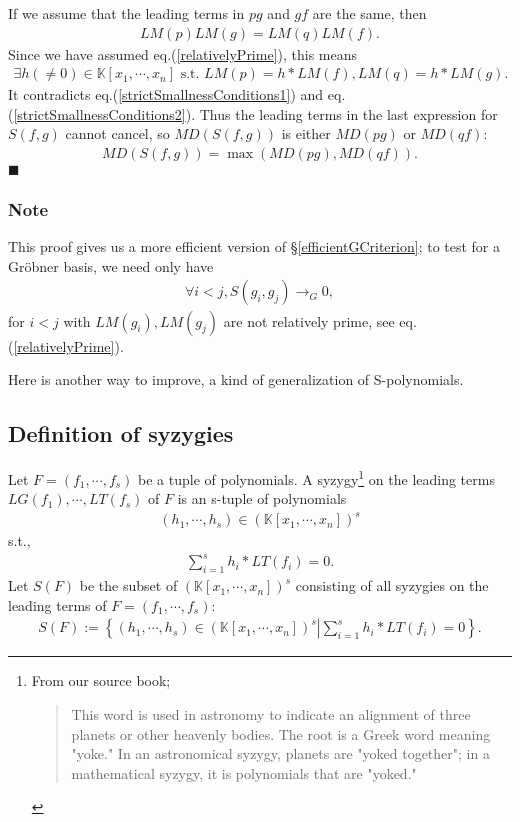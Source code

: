 \documentclass[11pt]{book}
\begin{document}
If we assume that the leading terms in $pg$ and $gf$ are the same, then
\begin{eqnarray}
LM(p)LM(g) = LM(q)LM(f).
\end{eqnarray}
Since we have assumed eq.(\ref{relativelyPrime}), this means
\begin{eqnarray}
\exists h (\neq 0) \in \mathbb{K}[x_1, \cdots, x_n] \text{ s.t. } LM(p) = h*LM(f), LM(q) = h* LM(g).  \qquad
\end{eqnarray}
It contradicts eq.(\ref{strictSmallnessConditions1}) and eq.(\ref{strictSmallnessConditions2}).
Thus the leading terms in the last expression for $S(f,g)$ cannot cancel, so $MD\left(S(f,g) \right)$ is either $MD(pg)$ or $MD(qf)$:
\begin{eqnarray}
MD\left(S(f,g) \right) = \max\left( MD(pg), MD(qf) \right).
\end{eqnarray}
$\blacksquare$

\subsubsection{Note}
This proof gives us a more efficient version of \S\ref{efficientGCriterion}; to test for a Gr\"obner basis, we need only have
\begin{eqnarray}
\forall i<j, S(g_i, g_j) \to_G 0,
\end{eqnarray}
for $i<j$ with $LM(g_i),LM(g_j)$ are not relatively prime, see eq.(\ref{relativelyPrime}).

Here is another way to improve, a kind of generalization of S-polynomials.

\subsection{Definition of syzygies}
Let $F = (f_1, \cdots, f_s)$ be a tuple of polynomials.
A syzygy\footnote{
From our source book;
\begin{quotation}
This word is used in astronomy to indicate an alignment of three planets or other heavenly bodies.
The root is a Greek word meaning "yoke."
In an astronomical syzygy, planets are "yoked together"; in a mathematical syzygy, it is polynomials that are "yoked."
\end{quotation}
} on the leading terms $LG(f_1), \cdots, LT(f_s)$ of $F$ is an s-tuple of polynomials
\begin{eqnarray}
(h_1, \cdots, h_s) \in (\mathbb{K}[x_1, \cdots, x_n])^s
\end{eqnarray}
s.t.,
\begin{eqnarray}
\sum_{i=1}^s h_i * LT(f_i) = 0.
\end{eqnarray}
Let $S(F)$ be the subset of $(\mathbb{K}[x_1, \cdots, x_n])^s$ consisting of all syzygies on the leading terms of $F = (f_1, \cdots, f_s)$:
\begin{eqnarray}
S(F) := \left\{\left. (h_1, \cdots, h_s) \in (\mathbb{K}[x_1, \cdots, x_n])^s \right| \sum_{i=1}^s h_i * LT(f_i) = 0\right\}.
\end{eqnarray}
\end{document}
